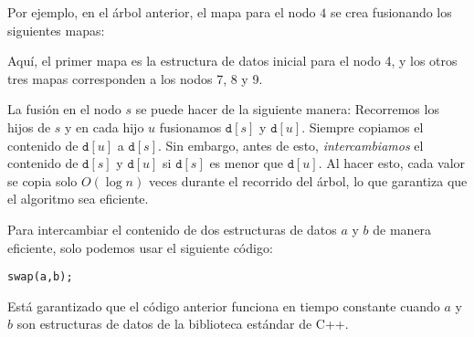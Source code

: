 Por ejemplo, en el árbol anterior, el mapa
para el nodo $4$ se crea fusionando los siguientes mapas:

\begin{center}
\end{center}

Aquí, el primer mapa es la estructura de datos inicial
para el nodo 4,
y los otros tres mapas corresponden a los nodos 7, 8 y 9.

La fusión en el nodo $s$ se puede hacer de la siguiente manera:
Recorremos los hijos de $s$
y en cada hijo $u$ fusionamos $\texttt{d}[s]$
y $\texttt{d}[u]$.
Siempre copiamos el contenido de $\texttt{d}[u]$
a $\texttt{d}[s]$.
Sin embargo, antes de esto, \emph{intercambiamos}
el contenido de $\texttt{d}[s]$ y $\texttt{d}[u]$
si $\texttt{d}[s]$ es menor que $\texttt{d}[u]$.
Al hacer esto, cada valor se copia solo $O(\log n)$
veces durante el recorrido del árbol,
lo que garantiza que el algoritmo sea eficiente.

Para intercambiar el contenido de dos estructuras de datos $a$ y $b$
de manera eficiente, solo podemos usar el siguiente código:
\begin{lstlisting}
swap(a,b);
\end{lstlisting}
Está garantizado que el código anterior funciona en tiempo constante
cuando $a$ y $b$ son estructuras de datos de la biblioteca estándar de C++.

